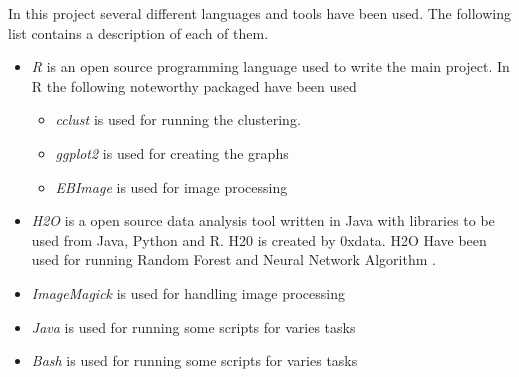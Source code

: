 In this project several different languages and tools have been used. The following list contains a description of each of them. 

\begin{itemize}
	\item \textit{R} is an open source programming language used to write the main project. In R the following noteworthy packaged have been used
		\begin{itemize}
			\item \textit{cclust} is used for running the clustering.
			\item \textit{ggplot2} is used for creating the graphs
			\item \textit{EBImage} is used for image processing
		\end{itemize}
	\item \textit{H2O} is a open source data analysis tool written in Java with libraries to be used from Java, Python and R. H20 is created by 0xdata. H2O Have been used for running Random Forest and Neural Network Algorithm \cite{H2O}.
	\item \textit{ImageMagick} is used for handling image processing \cite{ImgMag}
	\item \textit{Java} is used for running some scripts for varies tasks
	\item \textit{Bash} is used for running some scripts for varies tasks
\end{itemize}
